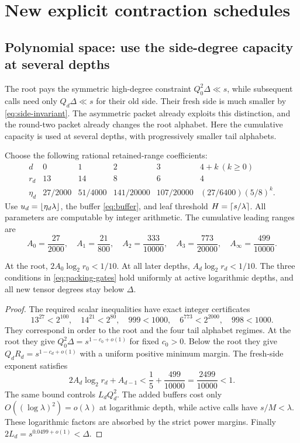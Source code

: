 \section{New explicit contraction schedules}
\label{sec:theory}

\subsection{Polynomial space: use the side-degree capacity at several depths}

The root pays the symmetric high-degree constraint
$Q_0^2\Delta\ll s$, while subsequent calls need only
$Q_d\Delta\ll s$ for their old side. Their fresh side is much smaller
by \eqref{eq:side-invariant}. The asymmetric packet already exploits this
distinction, and the round-two packet already changes the root alphabet.
Here the cumulative capacity is used at several depths, with progressively
smaller tail alphabets.

Choose the following rational retained-range coefficients:
\begin{equation}\label{eq:ps-schedule}
\begin{array}{c|ccccc}
 d&0&1&2&3&4+k\ (k\ge0)\\\hline
 r_d&13&14&8&6&4\\
 \eta_d&27/2000&51/4000&141/20000&107/20000&(27/6400)(5/8)^k.
\end{array}
\end{equation}
Use $u_d=\left\lfloor\eta_d\lambda\right\rfloor$, the buffer \eqref{eq:buffer}, and leaf
threshold $H=\left\lceil s/\lambda\right\rceil$. All parameters are computable by integer
arithmetic. The cumulative leading ranges are
\begin{equation}\label{eq:ps-capacities}
 A_0=\frac{27}{2000},\quad A_1=\frac{21}{800},\quad
 A_2=\frac{333}{10000},\quad A_3=\frac{773}{20000},\quad
 A_\infty=\frac{499}{10000}.
\end{equation}

\begin{lemma}
\label{lem:ps-gates}
At the root, $2A_0\log_2r_0<1/10$. At all later depths,
$A_d\log_2r_d<1/10$. The three conditions in
\eqref{eq:packing-gates} hold uniformly at active logarithmic depths,
and all new tensor degrees stay below $\Delta$.
\end{lemma}
\begin{proof}
The required scalar inequalities have exact integer certificates
\[
 13^{27}<2^{100},\quad 14^{21}<2^{80},\quad
 999<1000,\quad 6^{773}<2^{2000},\quad 998<1000.
\]
They correspond in order to the root and the four tail alphabet regimes.
At the root they give $Q_0^2\Delta=s^{1-c_0+o(1)}$ for fixed $c_0>0$.
Below the root they give $Q_dR_d=s^{1-c_d+o(1)}$ with a uniform positive
minimum margin. The fresh-side exponent satisfies
\[
 2A_d\log_2r_d+A_{d-1}<\frac15+\frac{499}{10000}
 =\frac{2499}{10000}<1.
\]
The same bound controls $L_dQ_d^2$. The added buffers cost only
$O((\log\lambda)^2)=o(\lambda)$ at logarithmic depth, while active
calls have $s/M<\lambda$. These logarithmic factors are absorbed by the
strict power margins. Finally $2L_d=s^{0.0499+o(1)}<\Delta$.
\end{proof}

